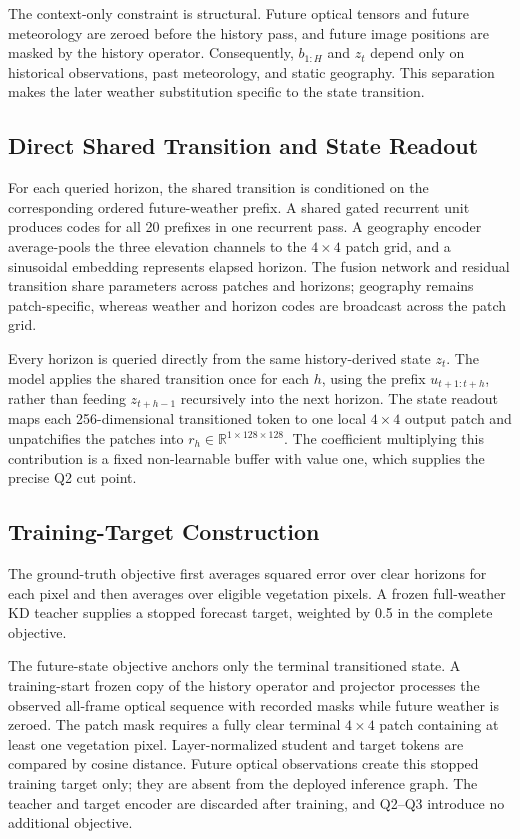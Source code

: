 \documentclass[letterpaper]{article}
\begin{document}
The context-only constraint is structural. Future optical tensors and future
meteorology are zeroed before the history pass, and future image positions are
masked by the history operator. Consequently, \(b_{1:H}\) and \(z_t\) depend
only on historical observations, past meteorology, and static geography. This
separation makes the later weather substitution specific to the state
transition.

\subsection{Direct Shared Transition and State Readout}

For each queried horizon, the shared transition is conditioned on the
corresponding ordered future-weather prefix. A shared gated recurrent unit
produces codes for all 20 prefixes in one recurrent pass. A geography encoder
average-pools the three elevation channels to the \(4\times4\) patch grid, and
a sinusoidal embedding represents elapsed horizon. The fusion network and
residual transition share parameters across patches and horizons; geography
remains patch-specific, whereas weather and horizon codes are broadcast
across the patch grid.

Every horizon is queried directly from the same history-derived state
\(z_t\). The model applies the shared transition once for each \(h\), using
the prefix \(u_{t+1:t+h}\), rather than feeding \(z_{t+h-1}\) recursively into
the next horizon. The state readout maps each 256-dimensional transitioned token
to one local \(4\times4\) output patch and unpatchifies the patches into
\(r_h\in\mathbb R^{1\times128\times128}\). The coefficient multiplying this
contribution is a fixed non-learnable buffer with value one, which supplies
the precise Q2 cut point.

\subsection{Training-Target Construction}

The ground-truth objective first averages squared error over clear horizons
for each pixel and then averages over eligible vegetation pixels. A frozen
full-weather KD teacher supplies a stopped forecast target, weighted by 0.5
in the complete objective.

The future-state objective anchors only the terminal transitioned state. A
training-start frozen copy of the history operator and projector processes the
observed all-frame optical sequence with recorded masks while future weather
is zeroed. The patch mask requires a fully clear terminal \(4\times4\) patch
containing at least one vegetation pixel. Layer-normalized student and target
tokens are compared by cosine distance. Future optical observations create
this stopped training target only; they are absent from the deployed
inference graph. The teacher and target encoder are discarded after training,
and Q2--Q3 introduce no additional objective.
\end{document}
